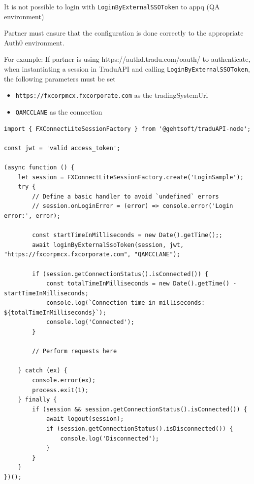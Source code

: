 \documentclass[11pt]{article}
\begin{document}
It is not possible to login with \verb|LoginByExternalSSOToken| to appq (QA environment)

Partner must ensure that the configuration is done correctly to the appropriate Auth0 environment.

For example: If partner is using https://authd.tradu.com/oauth/ to authenticate, when instantiating a session in TraduAPI and calling \verb|LoginByExternalSSOToken|, the following parameters must be set

\begin{itemize}
    \item \verb|https://fxcorpmcx.fxcorporate.com| as the tradingSystemUrl 
    \item \verb|QAMCCLANE| as the connection
\end{itemize}

\begin{codebox}
\begin{verbatim}
import { FXConnectLiteSessionFactory } from '@gehtsoft/traduAPI-node';

const jwt = 'valid access_token';

(async function () {
    let session = FXConnectLiteSessionFactory.create('LoginSample');
    try {
        // Define a basic handler to avoid `undefined` errors
        // session.onLoginError = (error) => console.error('Login error:', error);
        
        const startTimeInMilliseconds = new Date().getTime();;
        await loginByExternalSsoToken(session, jwt, "https://fxcorpmcx.fxcorporate.com", "QAMCCLANE");

        if (session.getConnectionStatus().isConnected()) {
            const totalTimeInMilliseconds = new Date().getTime() - startTimeInMilliseconds;
            console.log(`Connection time in milliseconds: ${totalTimeInMilliseconds}`);
            console.log('Connected');
        }

        // Perform requests here

    } catch (ex) {
        console.error(ex);
        process.exit(1);
    } finally {
        if (session && session.getConnectionStatus().isConnected()) {
            await logout(session);
            if (session.getConnectionStatus().isDisconnected()) {
                console.log('Disconnected');
            }
        }
    }
})();

\end{verbatim}
\end{codebox}
\end{document}

